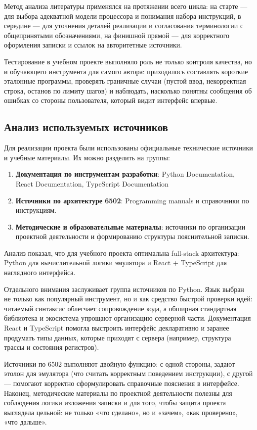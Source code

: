 \documentclass[12pt,a4paper]{article}
\begin{document}
Метод анализа литературы применялся на протяжении всего цикла: на старте --- для выбора адекватной модели процессора и понимания набора инструкций, в середине --- для уточнения деталей реализации и согласования терминологии с общепринятыми обозначениями, на финишной прямой --- для корректного оформления записки и ссылок на авторитетные источники.

Тестирование в учебном проекте выполняло роль не только контроля качества, но и обучающего инструмента для самого автора: приходилось составлять короткие эталонные программы, проверять граничные случаи (пустой ввод, некорректная строка, останов по лимиту шагов) и наблюдать, насколько понятны сообщения об ошибках со стороны пользователя, который видит интерфейс впервые.

\subsection{Анализ используемых источников}
Для реализации проекта были использованы официальные технические источники и учебные материалы. Их можно разделить на группы:
\begin{enumerate}
  \item \textbf{Документация по инструментам разработки}: Python Documentation, React Documentation, TypeScript Documentation
  \item \textbf{Источники по архитектуре 6502}: Programming manuals и справочники по инструкциям.
  \item \textbf{Методические и образовательные материалы}: источники по организации проектной деятельности и формированию структуры пояснительной записки.
\end{enumerate}

Анализ показал, что для учебного проекта оптимальна full-stack архитектура: Python для вычислительной логики эмулятора и React + TypeScript для наглядного интерфейса.

Отдельного внимания заслуживает группа источников по Python. Язык выбран не только как популярный инструмент, но и как средство быстрой проверки идей: читаемый синтаксис облегчает сопровождение кода, а обширная стандартная библиотека и экосистема упрощают организацию серверной части. Документация React и TypeScript помогла выстроить интерфейс декларативно и заранее продумать типы данных, которые приходят с сервера (например, структура трассы и состояния регистров). 

Источники по 6502 выполняют двойную функцию: с одной стороны, задают этолон для эмулятора (что считать корректным поведением инструкции), с другой --- помогают корректно сформулировать справочные пояснения в интерфейсе. Наконец, методические материалы по проектной деятельности полезны для соблюдения логики изложения записки и для того, чтобы защита проекта выглядела цельной: не только «что сделано», но и «зачем», «как проверено», «что дальше».
\end{document}
